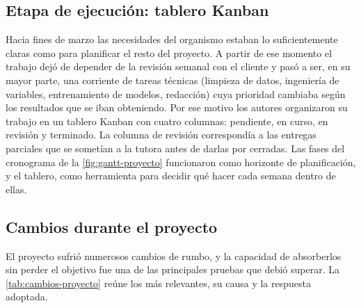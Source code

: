 \subsection{Etapa de ejecución: tablero Kanban}\label{ssec:ejecucion}

Hacia fines de marzo las necesidades del organismo estaban lo suficientemente claras como para planificar el resto del proyecto. A partir de ese momento el trabajo dejó de depender de la revisión semanal con el cliente y pasó a ser, en su mayor parte, una corriente de tareas técnicas (limpieza de datos, ingeniería de variables, entrenamiento de modelos, redacción) cuya prioridad cambiaba según los resultados que se iban obteniendo. Por ese motivo los autores organizaron su trabajo en un tablero Kanban con cuatro columnas: pendiente, en curso, en revisión y terminado. La columna de revisión correspondía a las entregas parciales que se sometían a la tutora antes de darlas por cerradas. Las fases del cronograma de la \cref{fig:gantt-proyecto} funcionaron como horizonte de planificación, y el tablero, como herramienta para decidir qué hacer cada semana dentro de ellas.

\subsection{Cambios durante el proyecto}\label{ssec:cambios}

El proyecto sufrió numerosos cambios de rumbo, y la capacidad de absorberlos sin perder el objetivo fue una de las principales pruebas que debió superar. La \cref{tab:cambios-proyecto} reúne los más relevantes, su causa y la respuesta adoptada.

